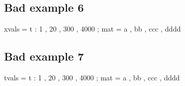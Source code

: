 \documentclass[12pt]{article}
\begin{document}
\subsection{Bad example 6}

\begin{functable}
    xvals = t : 1 , 20 , 300 , 4000 ;
    mat   = a , bb , ccc , dddd 
\end{functable}



\subsection{Bad example 7}

\begin{functable}
    tvals = t : 1 , 20 , 300 , 4000 ;
    mat   = a , bb , ccc , dddd 
\end{functable}
\end{document}
